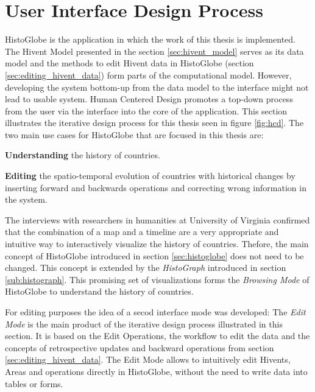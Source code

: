 
\section{User Interface Design Process} %
\label{sec:user_interface_design_process}

HistoGlobe is the application in which the work of this thesis is implemented. The Hivent Model presented in the section \ref{sec:hivent_model} serves as its data model and the methods to edit Hivent data in HistoGlobe (section \ref{sec:editing_hivent_data}) form parts of the computational model. However, developing the system bottom-up from the data model to the interface might not lead to usable system. Human Centered Design promotes a top-down process from the user via the interface into the core of the application. This section illustrates the iterative design process for this thesis seen in figure \ref{fig:hcd}. The two main use cases for HistoGlobe that are focused in this thesis are:

\begin{compactenum}
  \item \textbf{Understanding} the history of countries.
  \item \textbf{Editing} the spatio-temporal evolution of countries with historical changes by inserting forward and backwards operations and correcting wrong information in the system.
\end{compactenum}

The interviews with researchers in humanities at University of Virginia confirmed that the combination of a map and a timeline are a very appropriate and intuitive way to interactively visualize the history of countries. Thefore, the main concept of HistoGlobe introduced in section \ref{sec:histoglobe} does not need to be changed. This concept is extended by the \emph{HistoGraph} introduced in section \ref{sub:histograph}. This promising set of visualizations forms the \emph{Browsing Mode} of HistoGlobe to understand the history of countries.

For editing purposes the idea of a secod interface mode was developed: The \emph{Edit Mode} is the main product of the iterative design process illustrated in this section. It is based on the Edit Operations, the workflow to edit the data and the concepts of retrospective updates and backward operations from section \ref{sec:editing_hivent_data}. The Edit Mode allows to intuitively edit Hivents, Areas and operations directly in HistoGlobe, without the need to write data into tables or forms.

